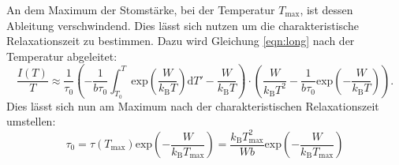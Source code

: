 An dem Maximum der Stomstärke, bei der Temperatur $T_\text{max}$, ist dessen Ableitung verschwindend. Dies lässt sich nutzen um die charakteristische Relaxationszeit zu bestimmen.
Dazu wird Gleichung \ref{eqn:long} nach der Temperatur abgeleitet:
\begin{equation}
    \frac{I(T)}{T} \approx \frac{1}{\tau_0} \left( - \frac{1}{b\tau_0}
    \int_{T_0}^T \text{exp}\left(\frac{W}{k_\text{B}T}\right)\text{d}T' - 
    \frac{W}{k_\text{B}T}\right) \cdot \left( \frac{W}{k_\text{B}T^2} - 
    \frac{1}{b\tau_0} 
    \text{exp}\left(-\frac{W}{k_\text{B}T}\right)\right).
\end{equation}
Dies lässt sich nun am Maximum nach der charakteristischen Relaxationszeit umstellen:
\begin{equation}
    \tau_0 = \tau(T_\text{max})\text{exp}\left(- \frac{W}{k_\text{B}T_\text{max}}\right) = \frac{k_\text{B}T^2_\text{max}}{Wb}\text{exp}\left(-\frac{W}{k_\text{B}T_\text{max}}\right)
    \label{eqn:taumaxsource}
\end{equation}